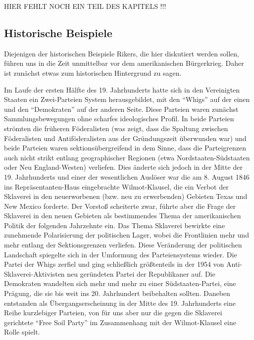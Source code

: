 HIER FEHLT NOCH EIN TEIL DES KAPITELS !!!

\subsection{Historische Beispiele}

Diejenigen der historischen Beispiele Rikers, die hier diskutiert werden
sollen, führen uns in die Zeit unmittelbar vor dem amerikanischen Bürgerkrieg.
Daher ist zunächst etwas zum historischen Hintergrund zu sagen. 

Im Laufe der ersten Hälfte des 19. Jahrhunderts hatte sich in den Vereinigten
Staaten ein Zwei-Parteien System herausgebildet, mit den ``Whigs'' auf der einen
und den ``Demokraten'' auf der anderen Seite. Diese Parteien waren zunächst
Sammlungsbewegungen ohne scharfes ideologisches Profil. In beide Parteien
strömten die früheren Föderalisten (was zeigt, dass die Spaltung zwischen
Föderalisten und Antiföderalisten aus der Gründungszeit überwunden war) und beide
Parteien waren sektionsübergreifend in dem Sinne, dass die Parteigrenzen auch
nicht strikt entlang geographischer Regionen (etwa Nordstaaten-Südstaaten oder
Neu England-Westen) verliefen. Dies änderte sich jedoch in der
Mitte der 19. Jahrhunderts und einer der wesentlichen Auslöser war die am 8.
August 1846 ins Repräsentanten-Haus eingebrachte Wilmot-Klausel, die ein Verbot
der Sklaverei in den neuerworbenen (bzw. neu zu erwerbenden) Gebieten Texas und
New Mexico forderte. Der Vorstoß scheiterte zwar, führte aber die Frage der
Sklaverei in den neuen Gebieten als bestimmendes Thema der amerikanischen Politik
der folgenden Jahrzehnte ein. Das Thema Sklaverei bewirkte eine zunehmende
Polarisierung der politischen Lager, wobei die Frontlinien mehr und mehr entlang
der Sektionsgrenzen verliefen. Diese Veränderung der politischen Landschaft
spiegelte sich in der Umformung des Parteiensystems wieder. Die Partei der Whigs
zerfiel und ging schließlich größtenteils in der 1954 von
Anti-Sklaverei-Aktivisten neu geründeten Partei der Republikaner auf. Die
Demokraten wandelten sich mehr und mehr zu einer Südstaaten-Partei, eine Prägung,
die sie bis weit ins 20. Jahrhundert beibehalten sollten. Daneben entstanden als
Übergangserscheinung in der Mitte des 19. Jahrhunderts eine Reihe kurzlebiger
Parteien, von für uns aber nur die gegen die Sklaverei gerichtete ``Free Soil
Party'' im Zusammenhang mit der Wilmot-Klausel eine Rolle spielt.

